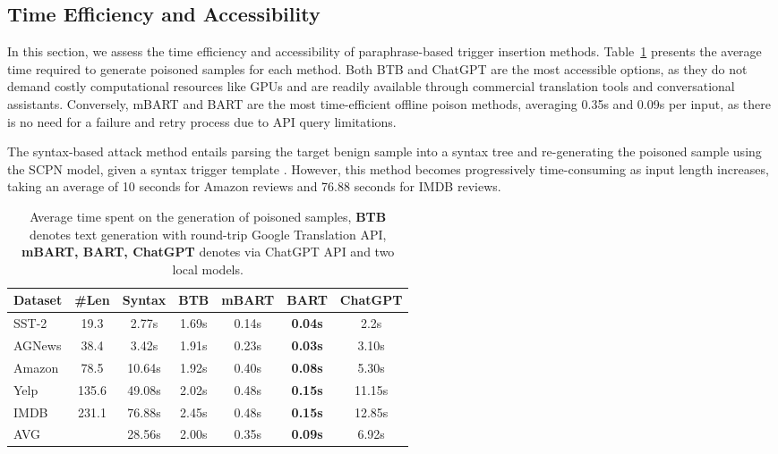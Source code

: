 \subsection{Time Efficiency and Accessibility}\label{sec:time_efficiency}
In this section, we assess the time efficiency and accessibility of paraphrase-based trigger insertion methods. Table~\ref{tab:TimeEfficience} presents the average time required to generate poisoned samples for each method. Both BTB and ChatGPT are the most accessible options, as they do not demand costly computational resources like GPUs and are readily available through commercial translation tools and conversational assistants. Conversely, mBART and BART are the most time-efficient offline poison methods, averaging 0.35s and 0.09s per input, as there is no need for a failure and retry process due to API query limitations.

The syntax-based attack method entails parsing the target benign sample into a syntax tree and re-generating the poisoned sample using the SCPN model, given a syntax trigger template \cite{huang2021generating}. However, this method becomes progressively time-consuming as input length increases, taking an average of 10 seconds for Amazon reviews and 76.88 seconds for IMDB reviews.
\begin{table}[h]
\centering
\tiny
\begin{tabular}{l|ccc|ccc}
\hline \textbf{Dataset} 
& \textbf{\#Len} & \textbf{Syntax} &\textbf{BTB} & \textbf{mBART} & \textbf{BART} & \textbf{ChatGPT}\\ \hline
SST-2  & 19.3  & 2.77s  & 1.69s  & 0.14s & \textbf{0.04s}  & 2.2s\\
AGNews & 38.4  & 3.42s  &  1.91s & 0.23s & \textbf{0.03s}   & 3.10s \\
Amazon & 78.5  & 10.64s &  1.92s & 0.40s & \textbf{0.08s}  & 5.30s \\
Yelp   & 135.6 & 49.08s &  2.02s & 0.48s & \textbf{0.15s}  & 11.15s \\
IMDB   & 231.1 & 76.88s &  2.45s & 0.48s & \textbf{0.15s}  & 12.85s \\\hline
AVG &        &28.56s&	2.00s &	0.35s &	\textbf{0.09s}	& 6.92s \\\hline

\end{tabular}
\caption{Average time spent on the generation of poisoned samples, \textbf{BTB} denotes text generation with round-trip Google Translation API, \textbf{mBART, BART, ChatGPT} denotes \method via ChatGPT API and two local models.}
\label{tab:TimeEfficience} 
\end{table}

